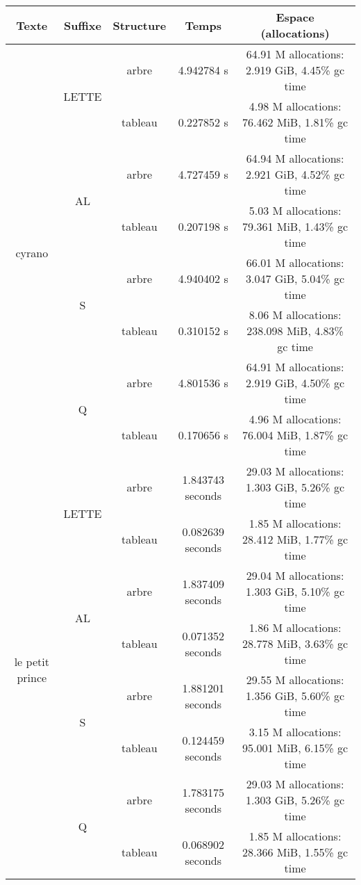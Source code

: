 \documentclass[a4paper,12pt]{article}
\begin{document}
\begin{center}
  \begin{tabular}{|c|c|c|c|c|}
    \hline
    Texte & Suffixe & Structure & Temps & Espace (allocations) \\
    \hline
    \multirow{8}{*}{cyrano} & \multirow{2}{*}{LETTE} & arbre & 4.942784 s & 64.91 M allocations: 2.919 GiB, 4.45\% gc time\\
    \cline{3-5}
    & & tableau & 0.227852 s & 4.98 M allocations: 76.462 MiB, 1.81\% gc time\\
    \cline{2-5}
    & \multirow{2}{*}{AL} & arbre & 4.727459 s & 64.94 M allocations: 2.921 GiB, 4.52\% gc time\\
    \cline{3-5}
    & & tableau & 0.207198 s & 5.03 M allocations: 79.361 MiB, 1.43\% gc time\\
    \cline{2-5}
    & \multirow{2}{*}{S} & arbre & 4.940402 s & 66.01 M allocations: 3.047 GiB, 5.04\% gc time\\
    \cline{3-5}
    & & tableau & 0.310152 s & 8.06 M allocations: 238.098 MiB, 4.83\% gc time\\
    \cline{2-5}
    & \multirow{2}{*}{Q} & arbre & 4.801536 s & 64.91 M allocations: 2.919 GiB, 4.50\% gc time\\
    \cline{3-5}
    & & tableau & 0.170656 s & 4.96 M allocations: 76.004 MiB, 1.87\% gc time\\
    \hline


    \multirow{8}{*}{le petit prince} & \multirow{2}{*}{LETTE} & arbre & 1.843743 seconds & 29.03 M allocations: 1.303 GiB, 5.26\% gc time\\
    \cline{3-5}
    & & tableau & 0.082639 seconds & 1.85 M allocations: 28.412 MiB, 1.77\% gc time\\
    \cline{2-5}
    & \multirow{2}{*}{AL} & arbre & 1.837409 seconds & 29.04 M allocations: 1.303 GiB, 5.10\% gc time\\
    \cline{3-5}
    & & tableau & 0.071352 seconds & 1.86 M allocations: 28.778 MiB, 3.63\% gc time\\
    \cline{2-5}
    & \multirow{2}{*}{S} & arbre & 1.881201 seconds & 29.55 M allocations: 1.356 GiB, 5.60\% gc time\\
    \cline{3-5}
    & & tableau & 0.124459 seconds & 3.15 M allocations: 95.001 MiB, 6.15\% gc time\\
    \cline{2-5}
    &\multirow{2}{*}{Q} & arbre & 1.783175 seconds & 29.03 M allocations: 1.303 GiB, 5.26\% gc time\\
    \cline{3-5}
    &  & tableau & 0.068902 seconds & 1.85 M allocations: 28.366 MiB, 1.55\% gc time\\
    \hline
  \end{tabular}
\end{center}
\end{document}
